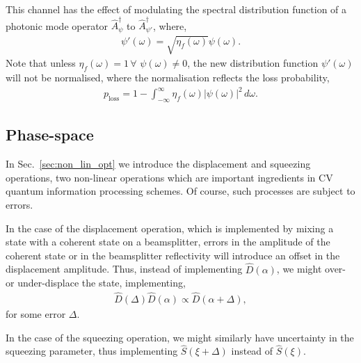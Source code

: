 This channel has the effect of modulating the spectral distribution function of a photonic mode operator $\hat{A}_\psi^\dag$ to $\hat{A}_{\psi'}^\dag$, where,
\begin{align}
\psi'(\omega) = \sqrt{\eta_f(\omega)}\psi(\omega).	
\end{align}
Note that unless \mbox{$\eta_f(\omega)=1\,\forall\,\,\psi(\omega)\neq 0$}, the new distribution function $\psi'(\omega)$ will not be normalised, where the normalisation reflects the loss probability,
\begin{align}
p_\mathrm{loss} = 1 - \int_{-\infty}^\infty \eta_f(\omega)|\psi(\omega)|^2\,d\omega.
\end{align}

%
%

\subsection{Phase-space} 

In Sec.~\ref{sec:non_lin_opt} we introduce the displacement and squeezing operations, two non-linear operations which are important ingredients in CV quantum information processing schemes. Of course, such processes are subject to errors.

In the case of the displacement operation, which is implemented by mixing a state with a coherent state on a beamsplitter, errors in the amplitude of the coherent state or in the beamsplitter reflectivity will introduce an offset in the displacement amplitude. Thus, instead of implementing $\hat{D}(\alpha)$, we might over- or under-displace the state, implementing,
\begin{align}
	\hat{D}(\Delta)\hat{D}(\alpha)\propto \hat{D}(\alpha+\Delta),
\end{align}
for some error $\Delta$.

In the case of the squeezing operation, we might similarly have uncertainty in the squeezing parameter, thus implementing $\hat{S}(\xi+\Delta)$ instead of $\hat{S}(\xi)$.